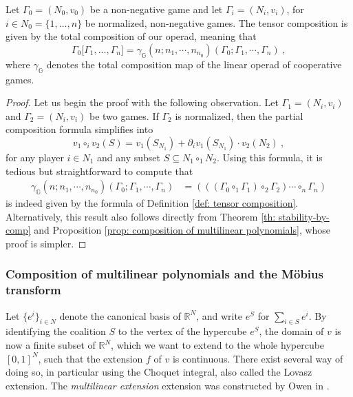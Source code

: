 \documentclass[a4paper,12pt]{amsart}
\begin{document}
\begin{theorem}\label{thm: comparison with Owen's tensor composition}
Let $\Gamma_0 = (N_0, v_0)$ be a non-negative game and let $\Gamma_i = (N_i, v_i)$, for $i \in N_0 = \{1, \ldots, n\}$ be normalized, non-negative games. The tensor composition is given by the total composition of our operad, meaning that 
\[
\Gamma_0 \big[\Gamma_1, \ldots, \Gamma_n] = \gamma_{\mathbb{G}}(n;n_1,\cdots,n_{n_0})(\Gamma_0;\Gamma_1,\cdots,\Gamma_n)~,
\]
where $\gamma_{\mathbb{G}}$ denotes the total composition map of the linear operad of cooperative games. 
\end{theorem}

\begin{proof}
Let us begin the proof with the following observation. Let $\Gamma_1 = (N_i, v_i)$ and $\Gamma_2 = (N_i, v_i)$ be two games. If $\Gamma_2$ is normalized, then the partial composition formula simplifies into
\[
v_1 \circ_i v_2(S) = v_1(S_{N_1}) + \partial_i v_1(S_{N_1})\cdot v_2(N_2)~, 
\]
for any player $i \in N_1$ and any subset $S \subseteq N_1 \circ_1 N_2$. Using this formula, it is tedious but straightforward to compute that 
\begin{align*}
\gamma_{\mathbb{G}}(n;n_1,\cdots,n_{n_0})(\Gamma_0;\Gamma_1,\cdots,\Gamma_n) &= (((\Gamma_0 \circ_1 \Gamma_1) \circ_2 \Gamma_2) \cdots \circ_n \Gamma_n)
\end{align*}
is indeed given by the formula of Definition \ref{def: tensor composition}. Alternatively, this result also follows directly from Theorem \ref{th: stability-by-comp} and Proposition \ref{prop: composition of multilinear polynomials}, whose proof is simpler. 
\end{proof}

\subsubsection{Composition of multilinear polynomials and the Möbius transform}
Let $\{e^i\}_{i \in N}$ denote the canonical basis of $\mathbb{R}^N$, and write $e^S$ for $\sum_{i \in S} e^i$. By identifying the coalition $S$ to the vertex of the hypercube $e^S$, the domain of $v$ is now a finite subset of $\mathbb{R}^N$, which we want to extend to the whole hypercube $[0, 1]^N$, such that the extension $f$ of $v$ is continuous. There exist several way of doing so, in particular using the Choquet integral, also called the Lovasz extension. The \emph{multilinear extension} extension was constructed by Owen in \cite{OwenMultilinear}.
\end{document}
